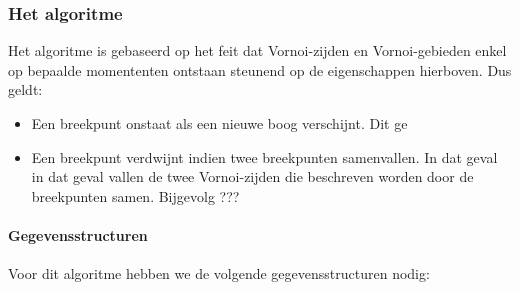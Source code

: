 \documentclass[a4paper,titlepage]{article}
\begin{document}
\subsubsection{Het algoritme}
Het algoritme is gebaseerd op het feit dat Vornoi-zijden en Vornoi-gebieden enkel op bepaalde momententen ontstaan steunend op de eigenschappen hierboven. Dus geldt:
\begin{itemize}
 \item Een breekpunt onstaat als een nieuwe boog verschijnt. Dit ge
 \item Een breekpunt verdwijnt indien twee breekpunten samenvallen. In dat geval in dat geval vallen de twee Vornoi-zijden die beschreven worden door de breekpunten samen. Bijgevolg ???
\end{itemize}
\paragraph{Gegevensstructuren}
Voor dit algoritme hebben we de volgende gegevensstructuren nodig:
\end{document}
